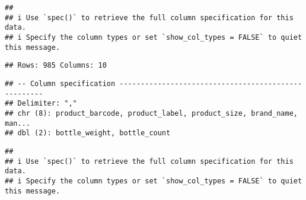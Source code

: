 \documentclass[
]{article}
\begin{document}
\begin{verbatim}
## 
## i Use `spec()` to retrieve the full column specification for this data.
## i Specify the column types or set `show_col_types = FALSE` to quiet this message.
\end{verbatim}

\begin{verbatim}
## Rows: 985 Columns: 10
\end{verbatim}

\begin{verbatim}
## -- Column specification ----------------------------------------------------
## Delimiter: ","
## chr (8): product_barcode, product_label, product_size, brand_name, man...
## dbl (2): bottle_weight, bottle_count
\end{verbatim}

\begin{verbatim}
## 
## i Use `spec()` to retrieve the full column specification for this data.
## i Specify the column types or set `show_col_types = FALSE` to quiet this message.
\end{verbatim}
\end{document}

